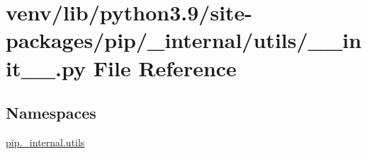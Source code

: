 \hypertarget{venv_2lib_2python3_89_2site-packages_2pip_2__internal_2utils_2____init_____8py}{}\section{venv/lib/python3.9/site-\/packages/pip/\+\_\+internal/utils/\+\_\+\+\_\+init\+\_\+\+\_\+.py File Reference}
\label{venv_2lib_2python3_89_2site-packages_2pip_2__internal_2utils_2____init_____8py}
\subsection*{Namespaces}
\begin{DoxyCompactItemize}
\item 
 \hyperlink{namespacepip_1_1__internal_1_1utils}{pip.\+\_\+internal.\+utils}
\end{DoxyCompactItemize}
